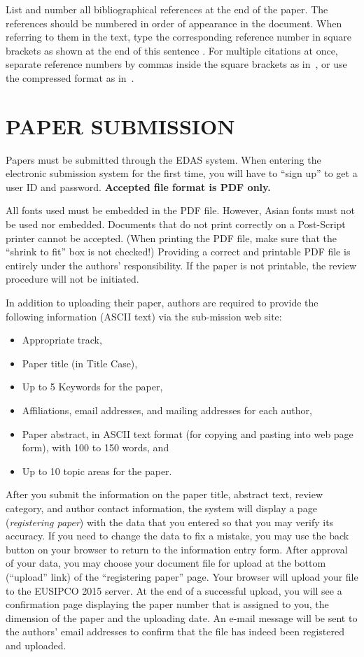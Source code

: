 \documentclass[a4paper]{article}
\begin{document}
List and number all bibliographical references at the end of the paper.  The references should be numbered in order of appearance in the document.  When referring to them in the text, type the corresponding reference number in square brackets as shown at the end of this sentence \cite{A1}. For multiple citations at once, separate reference numbers by commas inside the square brackets as in~\cite{A1,P1}, or use the compressed format as in~\cite{A1,P1,B1}.

\section{PAPER SUBMISSION}
\label{sec:submission}

Papers must be submitted through the EDAS system. When entering the electronic submission system for the first time, you will have to ``sign up'' to get a user ID and password. \textbf{Accepted file format is PDF only.}

All fonts used must be embedded in the PDF file. However, Asian fonts must not be used nor embedded. Documents that do not print correctly on a Post-Script printer cannot be accepted. (When printing the PDF file, make sure that the ``shrink to fit'' box is not checked!) Providing a correct and printable PDF file is entirely under the authors' responsibility. If the paper is not printable, the review procedure will not be initiated.

In addition to uploading their paper, authors are required to provide the following information (ASCII text) via the sub-mission web site:

\begin{itemize}
  \item Appropriate track,
  \item Paper title (in Title Case),
  \item Up to 5 Keywords for the paper,
  \item Affiliations, email addresses, and mailing addresses for each author,
  \item Paper abstract, in ASCII text format (for copying and pasting into web page form), with 100 to 150 words, and
  \item Up to 10 topic areas for the paper.
\end{itemize}

After you submit the information on the paper title, abstract text, review category, and author contact information, the system will display a page ({\it registering paper}) with the data that you entered so that you may verify its accuracy. If you need to change the data to fix a mistake, you may use the back button on your browser to return to the information entry form. After approval of your data, you may choose your document file for upload at the bottom (``upload'' link) of the ``registering paper'' page. Your browser will upload your file to the EUSIPCO 2015 server. At the end of a successful upload, you will see a confirmation page displaying the paper number that is assigned to you, the dimension of the paper and the uploading date. An e-mail message will be sent to the authors' email addresses to confirm that the file has indeed been registered and uploaded.
\end{document}
